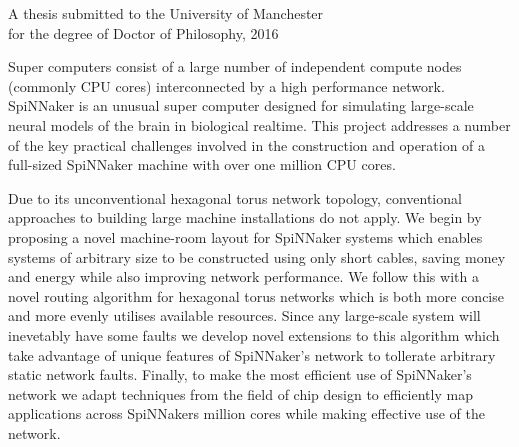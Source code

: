 {
	
	
	
	\vfill
	
	\begin{center}
		\textsc{\large\thesistitle}
		
		\vspace{1em}
		
		\thesisauthor
		
		\vspace{1em}
		
		A thesis submitted to the University of Manchester\\
		for the degree of Doctor of Philosophy, 2016
	\end{center}
	
	\vfill
	
	Super computers consist of a large number of independent compute nodes
	(commonly CPU cores) interconnected by a high performance network. SpiNNaker is
	an unusual super computer designed for simulating large-scale neural models of
	the brain in biological realtime. This project addresses a number of the key
	practical challenges involved in the construction and operation of a full-sized
	SpiNNaker machine with over one million CPU cores.
	
	Due to its unconventional hexagonal torus network topology, conventional
	approaches to building large machine installations do not apply. We begin by
	proposing a novel machine-room layout for SpiNNaker systems which enables
	systems of arbitrary size to be constructed using only short cables, saving
	money and energy while also improving network performance. We follow this with
	a novel routing algorithm for hexagonal torus networks which is both more
	concise and more evenly utilises available resources. Since any large-scale
	system will inevetably have some faults we develop novel extensions to this
	algorithm which take advantage of unique features of SpiNNaker's network to
	tollerate arbitrary static network faults. Finally, to make the most
	efficient use of SpiNNaker's network we adapt techniques from the field of chip
	design to efficiently map applications across SpiNNakers million cores while
	making effective use of the network.

	\par%
}
